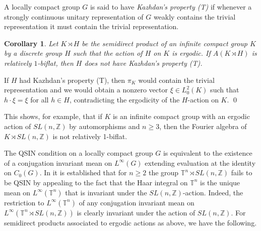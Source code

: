 \documentclass[preprint,12pt]{elsarticle}
\newtheorem{cor}[thm]{Corollary}
\begin{document}

A locally compact group $G$ is said to have \emph{Kazhdan's
property (T)} if whenever a strongly continuous unitary representation
of $G$ weakly contains the trivial representation it must contain
the trivial representation.

\begin{cor}
Let $K\rtimes H$ be the semidirect product of an infinite compact group $K$
by a discrete group $H$ such that the action of $H$ on $K$ is ergodic.
If $A(K\rtimes H)$ is relatively $1$-biflat, then $H$
does not have Kazhdan's property (T).\end{cor}
\begin{pf}
If $H$ had Kazhdan's property (T), then $\pi_{K}$
would contain the trivial representation and we would obtain a nonzero
vector $\xi\in L_0^2(K)$ such that $h\cdot\xi=\xi$
for all $h\in H$, contradicting the ergodicity of the $H$-action
on $K$.
\qed\end{pf}

This shows, for example, that if $K$ is an infinite
compact group with an ergodic action of $SL(n,\mathbb{Z})$
by automorphisms and $n\geq3$, then the Fourier algebra of $K\rtimes SL(n,\mathbb{Z})$
is not relatively 1-biflat.


The QSIN condition on a locally compact group $G$ is equivalent to
the existence of a conjugation invariant mean on $L^{\infty}(G)$
extending evaluation at the identity on $C_{0}(G)$. In
\cite{LR} it is established that for $n\geq2$ the group $\mathbb{T}^{n}\rtimes SL(n,\mathbb{Z})$
fails to be QSIN by appealing to the fact that the Haar integral on
$\mathbb{T}^{n}$ is the unique mean on $L^{\infty}(\mathbb{T}^{n})$
that is invariant under the $SL(n,\mathbb{Z})$-action.
Indeed, the restriction to $L^{\infty}(\mathbb{T}^{n})$
of any conjugation invariant mean on $L^{\infty}(\mathbb{T}^{n}\rtimes SL(n,\mathbb{Z}))$
is clearly invariant under the action of $SL(n,\mathbb{Z})$.
For semidirect products associated to ergodic actions as above, we
have the following.
\end{document}
